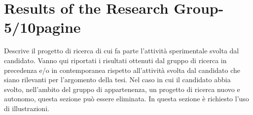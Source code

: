 
\chapter{Results of the Research Group-5/10pagine} %

\label{Chapter3} %


Descrive il progetto di ricerca di cui fa parte l’attività sperimentale svolta dal candidato. Vanno qui riportati i risultati ottenuti dal gruppo di ricerca in precedenza e/o in contemporanea rispetto all’attività svolta dal candidato che siano rilevanti per l’argomento della tesi. Nel caso in cui il candidato abbia svolto, nell’ambito del gruppo di appartenenza, un progetto di ricerca nuovo e autonomo, questa sezione può essere eliminata. In questa sezione è richiesto l’uso di illustrazioni.